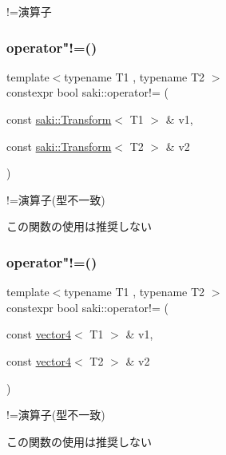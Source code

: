 !=演算子 

\mbox{\label{namespacesaki_abacbb997c38e24f818c0b63d26267aa3}} 
\subsubsection{\texorpdfstring{operator"!=()}{operator!=()}\hspace{0.1cm}{\footnotesize\ttfamily [6/11]}}
{\footnotesize\ttfamily template$<$typename T1 , typename T2 $>$ \\
constexpr bool saki\+::operator!= (\begin{DoxyParamCaption}\item[{const \mbox{\hyperlink{classsaki_1_1_transform}{saki\+::\+Transform}}$<$ T1 $>$ \&}]{v1,  }\item[{const \mbox{\hyperlink{classsaki_1_1_transform}{saki\+::\+Transform}}$<$ T2 $>$ \&}]{v2 }\end{DoxyParamCaption})}



!=演算子(型不一致) 

この関数の使用は推奨しない \mbox{\label{namespacesaki_abf6f98117a7a12898df59d2041040000}} 
\subsubsection{\texorpdfstring{operator"!=()}{operator!=()}\hspace{0.1cm}{\footnotesize\ttfamily [7/11]}}
{\footnotesize\ttfamily template$<$typename T1 , typename T2 $>$ \\
constexpr bool saki\+::operator!= (\begin{DoxyParamCaption}\item[{const \mbox{\hyperlink{classsaki_1_1vector4}{vector4}}$<$ T1 $>$ \&}]{v1,  }\item[{const \mbox{\hyperlink{classsaki_1_1vector4}{vector4}}$<$ T2 $>$ \&}]{v2 }\end{DoxyParamCaption})}



!=演算子(型不一致) 

この関数の使用は推奨しない \mbox{\label{namespacesaki_ae8393ad670f8bb199a92d4287bb1bf3a}} 
